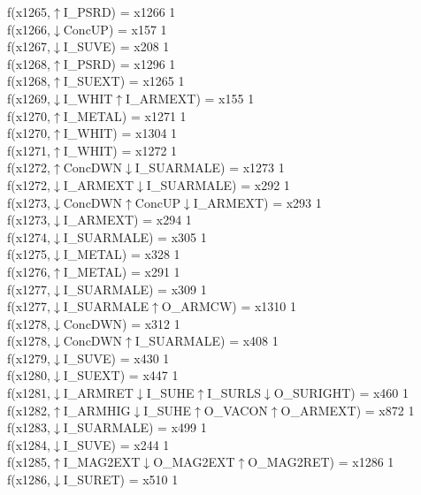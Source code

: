 f(x1265,$\uparrow$I\_PSRD) = x1266 {1} \\
f(x1266,$\downarrow$ConcUP) = x157 {1} \\
f(x1267,$\downarrow$I\_SUVE) = x208 {1} \\
f(x1268,$\uparrow$I\_PSRD) = x1296 {1} \\
f(x1268,$\uparrow$I\_SUEXT) = x1265 {1} \\
f(x1269,$\downarrow$I\_WHIT$\uparrow$I\_ARMEXT) = x155 {1} \\
f(x1270,$\uparrow$I\_METAL) = x1271 {1} \\
f(x1270,$\uparrow$I\_WHIT) = x1304 {1} \\
f(x1271,$\uparrow$I\_WHIT) = x1272 {1} \\
f(x1272,$\uparrow$ConcDWN$\downarrow$I\_SUARMALE) = x1273 {1} \\
f(x1272,$\downarrow$I\_ARMEXT$\downarrow$I\_SUARMALE) = x292 {1} \\
f(x1273,$\downarrow$ConcDWN$\uparrow$ConcUP$\downarrow$I\_ARMEXT) = x293 {1} \\
f(x1273,$\downarrow$I\_ARMEXT) = x294 {1} \\
f(x1274,$\downarrow$I\_SUARMALE) = x305 {1} \\
f(x1275,$\downarrow$I\_METAL) = x328 {1} \\
f(x1276,$\uparrow$I\_METAL) = x291 {1} \\
f(x1277,$\downarrow$I\_SUARMALE) = x309 {1} \\
f(x1277,$\downarrow$I\_SUARMALE$\uparrow$O\_ARMCW) = x1310 {1} \\
f(x1278,$\downarrow$ConcDWN) = x312 {1} \\
f(x1278,$\downarrow$ConcDWN$\uparrow$I\_SUARMALE) = x408 {1} \\
f(x1279,$\downarrow$I\_SUVE) = x430 {1} \\
f(x1280,$\downarrow$I\_SUEXT) = x447 {1} \\
f(x1281,$\downarrow$I\_ARMRET$\downarrow$I\_SUHE$\uparrow$I\_SURLS$\downarrow$O\_SURIGHT) = x460 {1} \\
f(x1282,$\uparrow$I\_ARMHIG$\downarrow$I\_SUHE$\uparrow$O\_VACON$\uparrow$O\_ARMEXT) = x872 {1} \\
f(x1283,$\downarrow$I\_SUARMALE) = x499 {1} \\
f(x1284,$\downarrow$I\_SUVE) = x244 {1} \\
f(x1285,$\uparrow$I\_MAG2EXT$\downarrow$O\_MAG2EXT$\uparrow$O\_MAG2RET) = x1286 {1} \\
f(x1286,$\downarrow$I\_SURET) = x510 {1} \\
